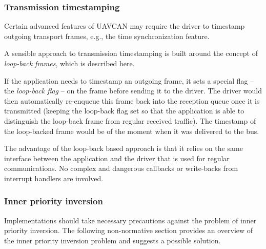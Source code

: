 \subsubsection{Transmission timestamping}

Certain advanced features of UAVCAN may require the driver to timestamp outgoing transport frames, e.g.,
the time synchronization feature.

\begin{remark}[breakable]
    A sensible approach to transmission timestamping is built around the concept of \emph{loop-back frames},
    which is described here.

    If the application needs to timestamp an outgoing frame, it sets a special flag -- the \emph{loop-back flag} --
    on the frame before sending it to the driver.
    The driver would then automatically re-enqueue this frame back into the reception queue once it is transmitted
    (keeping the loop-back flag set so that the application is able to distinguish the loop-back
    frame from regular received traffic).
    The timestamp of the loop-backed frame would be of the moment when it was delivered to the bus.

    The advantage of the loop-back based approach is that it relies on the same interface between
    the application and the driver that is used for regular communications.
    No complex and dangerous callbacks or write-backs from interrupt handlers are involved.
\end{remark}

\subsubsection{Inner priority inversion}

Implementations should take necessary precautions against the problem of inner priority inversion.
The following non-normative section provides an overview of the inner priority inversion problem and
suggests a possible solution.

